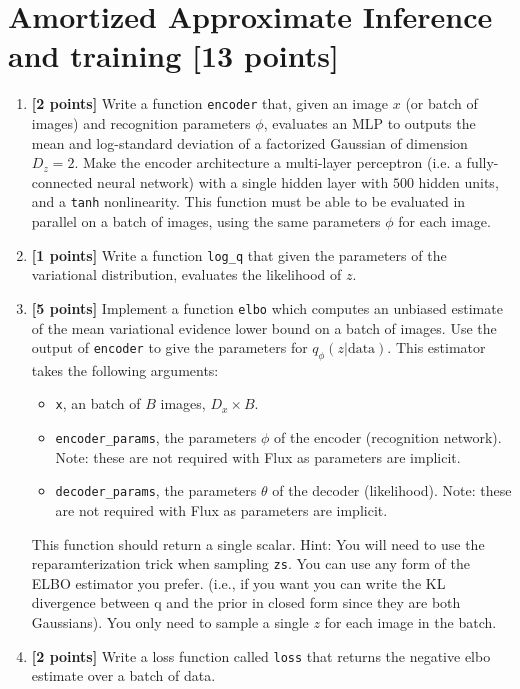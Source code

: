 \documentclass{article}
\begin{document}
\section{Amortized Approximate Inference and training [13 points]}
\begin{enumerate}[label=(\alph*)]
  \item {\bf [2 points]} Write a function \texttt{encoder} that, given an image $x$ (or batch of images) and recognition parameters $\phi$, evaluates an MLP to outputs the mean and log-standard deviation of a factorized Gaussian of dimension $D_z = 2$.
	Make the encoder architecture a multi-layer perceptron (i.e. a fully-connected neural network) with a single hidden layer with $500$ hidden units, and a \texttt{tanh} nonlinearity.
	This function must be able to be evaluated in parallel on a batch of images, using the same parameters $\phi$ for each image.

  \item {\bf [1 points]} Write a function \texttt{log\_q} that given the parameters of the variational distribution, evaluates the likelihood of $z$.
	
	\item {\bf [5 points]} Implement a function \texttt{elbo} which computes an unbiased estimate of the mean variational evidence lower bound on a batch of images.
	Use the output of \texttt{encoder} to give the parameters for $q_\phi(z|\text{data})$.
	This estimator takes the following arguments:
	\begin{itemize}
		\item \texttt{x}, an batch of $B$ images, $D_x \times B$.
    \item \texttt{encoder\_params}, the parameters $\phi$ of the encoder (recognition network). Note: these are not required with Flux as parameters are implicit.
		\item \texttt{decoder\_params}, the parameters $\theta$ of the decoder (likelihood). Note: these are not required with Flux as parameters are implicit.
	\end{itemize}
	This function should return a single scalar.
	Hint: You will need to use the reparamterization trick when sampling \texttt{zs}.
	You can use any form of the ELBO estimator you prefer.
  (i.e., if you want you can write the KL divergence between q and the prior in closed form since they are both Gaussians).
	You only need to sample a single $z$ for each image in the batch.
	
	\item {\bf [2 points]} Write a loss function called \texttt{loss}
  that returns the negative elbo estimate over a batch of data.
	

\end{enumerate}
\end{document}
